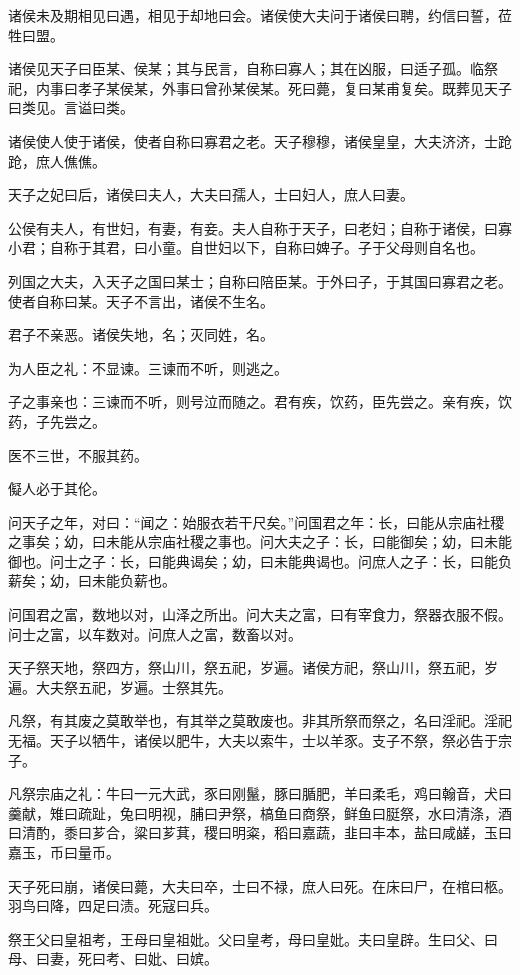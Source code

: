 \documentclass[]{article}
\begin{document}
诸侯未及期相见曰遇，相见于却地曰会。诸侯使大夫问于诸侯曰聘，约信曰誓，莅牲曰盟。

诸侯见天子曰臣某、侯某；其与民言，自称曰寡人；其在凶服，曰适子孤。临祭祀，内事曰孝子某侯某，外事曰曾孙某侯某。死曰薨，复曰某甫复矣。既葬见天子曰类见。言谥曰类。

诸侯使人使于诸侯，使者自称曰寡君之老。天子穆穆，诸侯皇皇，大夫济济，士跄跄，庶人僬僬。

天子之妃曰后，诸侯曰夫人，大夫曰孺人，士曰妇人，庶人曰妻。

公侯有夫人，有世妇，有妻，有妾。夫人自称于天子，曰老妇；自称于诸侯，曰寡小君；自称于其君，曰小童。自世妇以下，自称曰婢子。子于父母则自名也。

列国之大夫，入天子之国曰某士；自称曰陪臣某。于外曰子，于其国曰寡君之老。使者自称曰某。天子不言出，诸侯不生名。

君子不亲恶。诸侯失地，名；灭同姓，名。

为人臣之礼：不显谏。三谏而不听，则逃之。

子之事亲也：三谏而不听，则号泣而随之。君有疾，饮药，臣先尝之。亲有疾，饮药，子先尝之。

医不三世，不服其药。

儗人必于其伦。

问天子之年，对曰：``闻之：始服衣若干尺矣。''问国君之年：长，曰能从宗庙社稷之事矣；幼，曰未能从宗庙社稷之事也。问大夫之子：长，曰能御矣；幼，曰未能御也。问士之子：长，曰能典谒矣；幼，曰未能典谒也。问庶人之子：长，曰能负薪矣；幼，曰未能负薪也。

问国君之富，数地以对，山泽之所出。问大夫之富，曰有宰食力，祭器衣服不假。问士之富，以车数对。问庶人之富，数畜以对。

天子祭天地，祭四方，祭山川，祭五祀，岁遍。诸侯方祀，祭山川，祭五祀，岁遍。大夫祭五祀，岁遍。士祭其先。

凡祭，有其废之莫敢举也，有其举之莫敢废也。非其所祭而祭之，名曰淫祀。淫祀无福。天子以牺牛，诸侯以肥牛，大夫以索牛，士以羊豕。支子不祭，祭必告于宗子。

凡祭宗庙之礼：牛曰一元大武，豕曰刚鬣，豚曰腯肥，羊曰柔毛，鸡曰翰音，犬曰羹献，雉曰疏趾，兔曰明视，脯曰尹祭，槁鱼曰商祭，鲜鱼曰脡祭，水曰清涤，酒曰清酌，黍曰芗合，粱曰芗萁，稷曰明粢，稻曰嘉蔬，韭曰丰本，盐曰咸鹾，玉曰嘉玉，币曰量币。

天子死曰崩，诸侯曰薨，大夫曰卒，士曰不禄，庶人曰死。在床曰尸，在棺曰柩。羽鸟曰降，四足曰渍。死寇曰兵。

祭王父曰皇祖考，王母曰皇祖妣。父曰皇考，母曰皇妣。夫曰皇辟。生曰父、曰母、曰妻，死曰考、曰妣、曰嫔。
\end{document}
